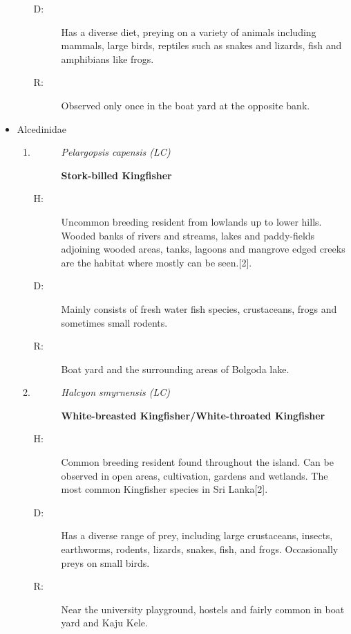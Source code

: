 \begin{itemize}
\begin{enumerate}
\begin{description}
\item[D: ]%
Has a diverse diet, preying on a variety of animals including mammals, large birds, reptiles such as snakes and lizards, fish and amphibians like frogs.%
\item[R: ]%
Observed only once in the boat yard at the opposite bank.%
\end{description}%
\end{enumerate}%
\item%
Alcedinidae%
\begin{enumerate}%
\item%
\begin{description}%
\item[]%
\textit{Pelargopsis capensis (LC)}%
\item[]%
\textbf{Stork{-}billed Kingfisher}%
\end{description}%
\begin{description}%
\item[H: ]%
Uncommon breeding resident from lowlands up to lower hills. Wooded banks of rivers and streams, lakes and paddy-fields adjoining wooded areas, tanks, lagoons and mangrove edged creeks are the habitat where mostly can be seen.{[}2{]}.%
\item[D: ]%
Mainly consists of fresh water fish species, crustaceans, frogs and sometimes small rodents.%
\item[R: ]%
Boat yard and the surrounding areas of Bolgoda lake.%
\end{description}%
\item%
\begin{description}%
\item[]%
\textit{Halcyon smyrnensis (LC)}%
\item[]%
\textbf{White{-}breasted Kingfisher/White{-}throated Kingfisher}%
\end{description}%
\begin{description}%
\item[H: ]%
Common breeding resident found throughout the island. Can be observed in open areas, cultivation, gardens and wetlands. The most common Kingfisher species in Sri Lanka{[}2{]}.%
\item[D: ]%
Has a diverse range of prey, including large crustaceans, insects, earthworms, rodents, lizards, snakes, fish, and frogs. Occasionally preys on small birds.%
\item[R: ]%
Near the university playground, hostels and fairly common in boat yard and Kaju Kele.%
\end{description}%

\end{enumerate}
\end{itemize}
